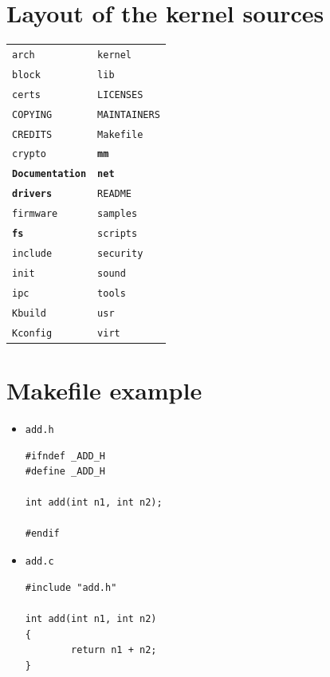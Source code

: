 \documentclass{beamer}
\begin{document}
\section{Layout of the kernel sources}
\label{sec:layout-kernel-source}

\begin{frame}[fragile]
  \begin{tabular}{ll}
    \texttt{arch} & \texttt{kernel} \\
    \texttt{block} & \texttt{lib} \\
    \texttt{certs} & \texttt{LICENSES} \\
    \texttt{COPYING} & \texttt{MAINTAINERS} \\
    \texttt{CREDITS} & \texttt{Makefile} \\
    \texttt{crypto} & \textbf{\texttt{mm}} \\
    \textbf{\texttt{Documentation}} & \textbf{\texttt{net}} \\
    \textbf{\texttt{drivers}} & \texttt{README} \\
    \texttt{firmware} & \texttt{samples} \\
    \textbf{\texttt{fs}} & \texttt{scripts} \\
    \texttt{include} & \texttt{security} \\
    \texttt{init} & \texttt{sound} \\
    \texttt{ipc} & \texttt{tools} \\
    \texttt{Kbuild} & \texttt{usr} \\
    \texttt{Kconfig} & \texttt{virt} \\
  \end{tabular}
\end{frame}

\section{Makefile example}
\label{sec:makefiles}

\begin{frame}[fragile]
  \begin{itemize}
  \item \texttt{add.h}
\begin{lstlisting}
#ifndef _ADD_H
#define _ADD_H

int add(int n1, int n2);

#endif
\end{lstlisting}
  \item \texttt{add.c}
\begin{lstlisting}
#include "add.h"

int add(int n1, int n2)
{
        return n1 + n2;
}
\end{lstlisting}
  \end{itemize}
\end{frame}
\end{document}
